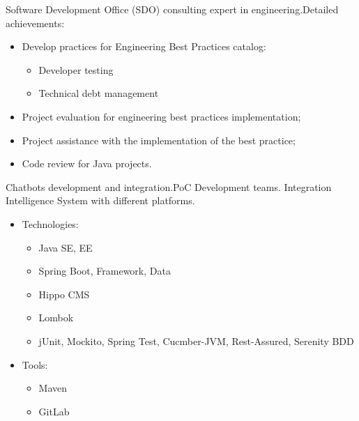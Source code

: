 \documentclass[11pt, a4paper]{moderncv}
\begin{document}
{Software Development Office (SDO) consulting expert in engineering.\newline{}Detailed achievements:
\begin{itemize}
\item Develop practices for Engineering Best Practices catalog:
\begin{itemize}
\item Developer testing
\item Technical debt management
\end{itemize}
\item Project evaluation for engineering best practices implementation;
\item Project assistance with the implementation of the best practice;
\item Code review for Java projects.
\end{itemize}}

{Chatbots development and integration.\newline{}PoC Development teams. Integration Intelligence System with different platforms.
\begin{itemize}
\item Technologies:
\begin{itemize}
\item Java SE, EE
\item Spring Boot, Framework, Data
\item Hippo CMS
\item Lombok
\item jUnit, Mockito, Spring Test, Cucmber-JVM, Rest-Assured, Serenity BDD  
\end{itemize}
\item Tools:
\begin{itemize}
\item Maven
\item GitLab 
\end{itemize}
\end{itemize}}
\end{document}
